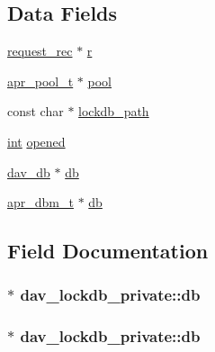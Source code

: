 \subsection*{Data Fields}
\begin{DoxyCompactItemize}
\item 
\hyperlink{structrequest__rec}{request\+\_\+rec} $\ast$ \hyperlink{structdav__lockdb__private_ad35f6c9b603531f4c64e10f17e5f8eca}{r}
\item 
\hyperlink{structapr__pool__t}{apr\+\_\+pool\+\_\+t} $\ast$ \hyperlink{structdav__lockdb__private_a6bacca8de1371809b1943142568ba4ea}{pool}
\item 
const char $\ast$ \hyperlink{structdav__lockdb__private_a72431a8f24487656d4d3d9b51a359fff}{lockdb\+\_\+path}
\item 
\hyperlink{pcre_8txt_a42dfa4ff673c82d8efe7144098fbc198}{int} \hyperlink{structdav__lockdb__private_a34cc60423ed00d90a9800cebed1ee74a}{opened}
\item 
\hyperlink{structdav__db}{dav\+\_\+db} $\ast$ \hyperlink{structdav__lockdb__private_a88ba10e1f8b87d6ed53fc7cb2b2c0100}{db}
\item 
\hyperlink{structapr__dbm__t}{apr\+\_\+dbm\+\_\+t} $\ast$ \hyperlink{structdav__lockdb__private_a3efe84879ea1847d9a4d681384b5af95}{db}
\end{DoxyCompactItemize}


\subsection{Field Documentation}
\subsubsection[{\texorpdfstring{db}{db}}]{$\ast$ dav\+\_\+lockdb\+\_\+private\+::db}\hypertarget{structdav__lockdb__private_a3efe84879ea1847d9a4d681384b5af95}{}\label{structdav__lockdb__private_a3efe84879ea1847d9a4d681384b5af95}
\subsubsection[{\texorpdfstring{db}{db}}]{$\ast$ dav\+\_\+lockdb\+\_\+private\+::db}\hypertarget{structdav__lockdb__private_a88ba10e1f8b87d6ed53fc7cb2b2c0100}{}\label{structdav__lockdb__private_a88ba10e1f8b87d6ed53fc7cb2b2c0100}
